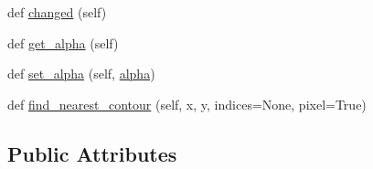 \begin{DoxyCompactItemize}
\item 
def \hyperlink{classmatplotlib_1_1contour_1_1ContourSet_a4e0a2ab0b9b4e14cebfbe3a6ac2b38bb}{changed} (self)
\item 
def \hyperlink{classmatplotlib_1_1contour_1_1ContourSet_afd47cb2a1df93bfb8f09ebd5a8df70fc}{get\+\_\+alpha} (self)
\item 
def \hyperlink{classmatplotlib_1_1contour_1_1ContourSet_a1ae000306e7e31d3cf55fab84a61d2a1}{set\+\_\+alpha} (self, \hyperlink{classmatplotlib_1_1contour_1_1ContourSet_aca314c8af742abe8ec5a9e2124dc2954}{alpha})
\item 
def \hyperlink{classmatplotlib_1_1contour_1_1ContourSet_aa67cdb1aac2c194f9ac6fe97dff6e065}{find\+\_\+nearest\+\_\+contour} (self, x, y, indices=None, pixel=True)
\end{DoxyCompactItemize}
\subsection*{Public Attributes}
